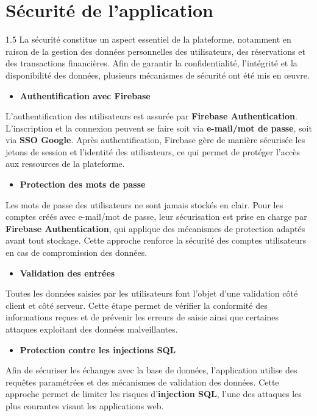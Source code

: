 \documentclass[a4paper,12pt]{report}
\begin{document}
\section{Sécurité de l'application}
\vspace{0.5cm}
\begin{spacing}{1.5}
\justifying
La sécurité constitue un aspect essentiel de la plateforme, notamment en raison de la gestion des données personnelles des utilisateurs, des réservations et des transactions financières. Afin de garantir la confidentialité, l'intégrité et la disponibilité des données, plusieurs mécanismes de sécurité ont été mis en œuvre.
\begin{itemize}
    \item \textbf{Authentification avec Firebase}
\end{itemize}
L'authentification des utilisateurs est assurée par \textbf{Firebase Authentication}. L'inscription et la connexion peuvent se faire soit via \textbf{e-mail/mot de passe}, soit via \textbf{SSO Google}. Après authentification, Firebase gère de manière sécurisée les jetons de session et l'identité des utilisateurs, ce qui permet de protéger l'accès aux ressources de la plateforme.
\begin{itemize}
    \item \textbf{Protection des mots de passe}
\end{itemize}
Les mots de passe des utilisateurs ne sont jamais stockés en clair. Pour les comptes créés avec e-mail/mot de passe, leur sécurisation est prise en charge par \textbf{Firebase Authentication}, qui applique des mécanismes de protection adaptés avant tout stockage. Cette approche renforce la sécurité des comptes utilisateurs en cas de compromission des données.
\begin{itemize}
    \item \textbf{Validation des entrées}
\end{itemize}
Toutes les données saisies par les utilisateurs font l'objet d'une validation côté client et côté serveur. Cette étape permet de vérifier la conformité des informations reçues et de prévenir les erreurs de saisie ainsi que certaines attaques exploitant des données malveillantes.
\begin{itemize}
    \item \textbf{Protection contre les injections SQL}
\end{itemize}
Afin de sécuriser les échanges avec la base de données, l'application utilise des requêtes paramétrées et des mécanismes de validation des données. Cette approche permet de limiter les risques d'\textbf{injection SQL}, l'une des attaques les plus courantes visant les applications web.

\end{spacing}
\end{document}
